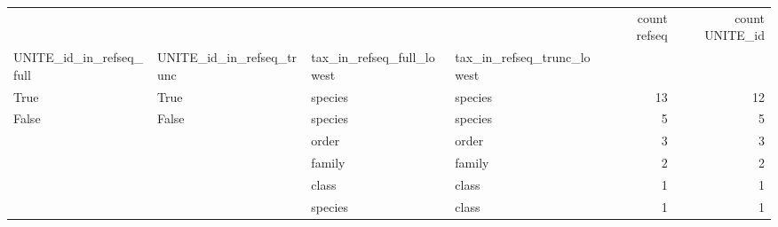 \begin{tabular}{llllrr}
\toprule
 &  &  &  & count refseq & count UNITE\_id \\
UNITE_id_in_refseq_full & UNITE_id_in_refseq_trunc & tax_in_refseq_full_lowest & tax_in_refseq_trunc_lowest &  &  \\
\midrule
True & True & species & species & 13 & 12 \\
\cline{1-6} \cline{2-6} \cline{3-6}
\multirow[t]{5}{*}{False} & \multirow[t]{5}{*}{False} & species & species & 5 & 5 \\
\cline{3-6}
 &  & order & order & 3 & 3 \\
\cline{3-6}
 &  & family & family & 2 & 2 \\
\cline{3-6}
 &  & class & class & 1 & 1 \\
\cline{3-6}
 &  & species & class & 1 & 1 \\
\cline{1-6} \cline{2-6} \cline{3-6}
\bottomrule
\end{tabular}
